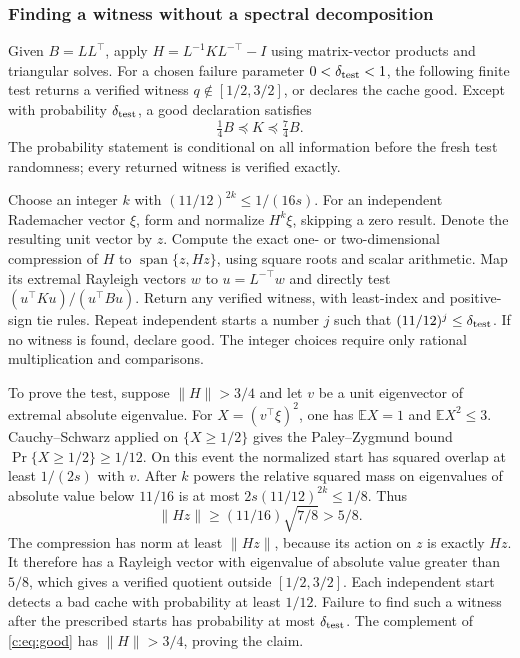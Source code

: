 \documentclass[11pt]{amsart}
\theoremstyle{definition}\newtheorem{definition}[theorem]{Definition}
\theoremstyle{remark}\newtheorem{remark}[theorem]{Remark}
\numberwithin{equation}{section}
\begin{document}
\subsubsection{Finding a witness without a spectral decomposition}\label{c:tester}
Given $B=LL^\top$, apply
$H=L^{-1}KL^{-\top}-I$ using matrix-vector products and triangular solves.
For a chosen failure parameter $0<\delta_{\rm test}<1$, the following
finite test returns a verified witness $q\notin[1/2,3/2]$, or declares the
cache good. Except with probability $\delta_{\rm test}$, a good declaration
satisfies
\begin{equation}\label{c:eq:good}
 \tfrac14 B\preceq K\preceq\tfrac74 B.
\end{equation}
The probability statement is conditional on all information before the
fresh test randomness; every returned witness is verified exactly.

Choose an integer $k$ with $(11/12)^{2k}\le1/(16s)$.
For an independent Rademacher vector $\xi$, form and normalize $H^k\xi$,
skipping a zero result. Denote the resulting unit vector by $z$. Compute the exact
one- or two-dimensional compression of $H$ to
$\operatorname{span}\{z,Hz\}$, using square roots and scalar arithmetic.
Map its extremal Rayleigh vectors $w$ to $u=L^{-\top}w$ and directly test
$(u^\top Ku)/(u^\top Bu)$. Return any verified witness, with least-index
and positive-sign tie rules. Repeat independent starts a number $j$ such
that $(11/12)^j\le\delta_{\rm test}$. If no witness is found, declare good.
The integer choices require only rational multiplication and comparisons.

To prove the test, suppose $\|H\|>3/4$ and let $v$ be a unit eigenvector
of extremal absolute eigenvalue. For $X=(v^\top\xi)^2$, one has
$\mathbb EX=1$ and $\mathbb EX^2\le3$. Cauchy--Schwarz applied on
$\{X\ge1/2\}$ gives the Paley--Zygmund bound
$\Pr\{X\ge1/2\}\ge1/12$. On this event the normalized start has squared
overlap at least $1/(2s)$ with $v$. After $k$ powers the relative squared
mass on eigenvalues of absolute value below $11/16$ is at most
$2s(11/12)^{2k}\le1/8$. Thus
\[
 \|Hz\|\ge(11/16)\sqrt{7/8}>5/8.
\]
The compression has norm at least $\|Hz\|$, because its action on $z$
is exactly $Hz$. It therefore has a Rayleigh vector with eigenvalue of
absolute value greater than $5/8$, which gives a verified quotient outside
$[1/2,3/2]$. Each independent start detects a bad cache with probability
at least $1/12$. Failure to find such a witness after the prescribed starts
has probability at most $\delta_{\rm test}$. The complement of
\eqref{c:eq:good} has $\|H\|>3/4$, proving the claim.
\end{document}
